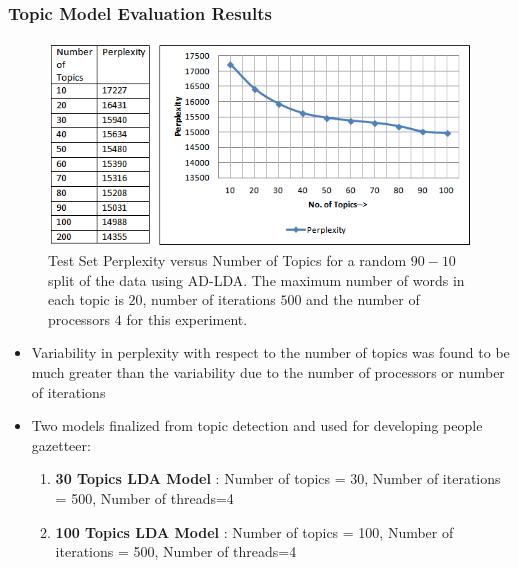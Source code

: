 \documentclass{beamer}
\begin{document}
\begin{frame}[allowframebreaks]
\frametitle{Topic Model Evaluation Results}
\begin{figure}[ht]
\begin{center}
\includegraphics[scale=0.5]{images/topicperplex2}
\caption{Test Set Perplexity versus Number of Topics for a random $90-10$ split of the data using AD-LDA. The maximum number of words in each topic is $20$, number of iterations $500$ and the number of processors $4$ for this experiment.}
\end{center}
\end{figure}

\begin{itemize}
\item
 Variability in perplexity with respect to the number of topics was found to be much greater than the variability due to the number of processors or number of iterations

\item
Two models finalized from topic detection and used for developing people gazetteer:
\begin{enumerate}
 \item \textbf{30 Topics LDA Model} : Number of topics = 30, Number of iterations = 500, Number of threads=4
 \item \textbf{100 Topics LDA Model} : Number of topics = 100, Number of iterations = 500, Number of threads=4
\end{enumerate}
\end{itemize}
\end{frame}
\end{document}
